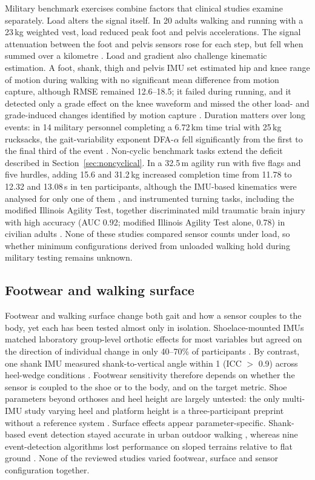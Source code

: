 \documentclass[10pt,a4paper,twocolumn]{article}
\begin{document}
Military benchmark exercises combine factors that clinical studies examine separately. Load alters the signal itself. In 20 adults walking and running with a 23\,kg weighted vest, load reduced peak foot and pelvis accelerations. The signal attenuation between the foot and pelvis sensors rose for each step, but fell when summed over a kilometre \citep{fain2024b}. Load and gradient also challenge kinematic estimation. A foot, shank, thigh and pelvis IMU set estimated hip and knee range of motion during walking with no significant mean difference from motion capture, although RMSE remained 12.6--18.5\textdegree; it failed during running, and it detected only a grade effect on the knee waveform and missed the other load- and grade-induced changes identified by motion capture \citep{fain2024a}. Duration matters over long events: in 14 military personnel completing a 6.72\,km time trial with 25\,kg rucksacks, the gait-variability exponent DFA-$\alpha$ fell significantly from the first to the final third of the event \citep{feigel2026}. Non-cyclic benchmark tasks extend the deficit described in Section~\ref{sec:noncyclical}. In a 32.5\,m agility run with five flags and five hurdles, adding 15.6 and 31.2\,kg increased completion time from 11.78 to 12.32 and 13.08\,s in ten participants, although the IMU-based kinematics were analysed for only one of them \citep{kessels2021}, and instrumented turning tasks, including the modified Illinois Agility Test, together discriminated mild traumatic brain injury with high accuracy (AUC 0.92; modified Illinois Agility Test alone, 0.78) in civilian adults \citep{fino2025}. None of these studies compared sensor counts under load, so whether minimum configurations derived from unloaded walking hold during military testing remains unknown.

\subsection{Footwear and walking surface}

Footwear and walking surface change both gait and how a sensor couples to the body, yet each has been tested almost only in isolation. Shoelace-mounted IMUs matched laboratory group-level orthotic effects for most variables but agreed on the direction of individual change in only 40--70\% of participants \citep{lewin2023}. By contrast, one shank IMU measured shank-to-vertical angle within 1\textdegree{} (ICC $>$ 0.9) across heel-wedge conditions \citep{dejong2021}. Footwear sensitivity therefore depends on whether the sensor is coupled to the shoe or to the body, and on the target metric. Shoe parameters beyond orthoses and heel height are largely untested: the only multi-IMU study varying heel and platform height is a three-participant preprint without a reference system \citep{meghapathirana2024}. Surface effects appear parameter-specific. Shank-based event detection stayed accurate in urban outdoor walking \citep{storm2016}, whereas nine event-detection algorithms lost performance on sloped terrains relative to flat ground \citep{trigo2025}. None of the reviewed studies varied footwear, surface and sensor configuration together.
\end{document}
